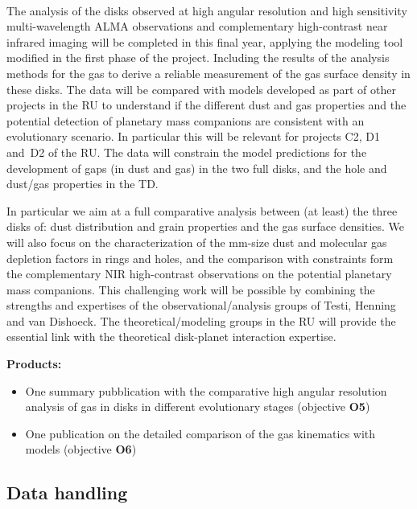 \documentclass[10pt,fleqn,twoside]{article}
\begin{document}
\vspace{1em}{\Tcol\bf Months 25-36}\\
The analysis of the disks observed at high angular resolution and high sensitivity multi-wavelength ALMA observations and complementary high-contrast near infrared imaging will be completed in this final year, applying the modeling tool modified in the first phase of the project. Including the results of the analysis
methods for the gas to derive a reliable measurement of the gas surface density in these disks. 
The data will be compared with models developed as 
part of other projects in the RU to understand if the different dust 
and gas properties and the potential detection of planetary mass companions are consistent with an evolutionary scenario. In particular this will be relevant for projects C2, D1 and~D2 of the RU. The data will constrain the model predictions for the development of gaps (in dust and gas) in the two full disks, and the hole and dust/gas properties in the TD.

In particular we aim at a full comparative analysis between (at least) the three disks of: dust distribution and grain properties and the gas surface densities. We will also focus on the characterization of the mm-size dust and molecular gas depletion factors in rings and holes, and the comparison with constraints form the complementary NIR high-contrast observations on the potential planetary mass companions. This challenging work will be possible by combining the strengths and expertises of the observational/analysis groups of Testi, Henning and van Dishoeck. The theoretical/modeling groups in the RU will provide the essential link with the theoretical disk-planet interaction expertise.

\smallskip
{\bf Products:} 
\begin{itemize}
\item One summary pubblication with the comparative high angular resolution analysis of gas in disks in different evolutionary stages (objective {\bf O5})
\item One publication on the detailed comparison of the gas kinematics with models (objective {\bf O6})
\end{itemize}


\subsection{Data handling}
\end{document}
